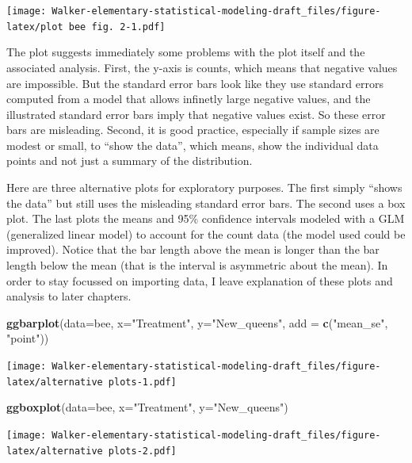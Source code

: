 \documentclass[]{book}
\newenvironment{Shaded}{\begin{snugshade}}{\end{snugshade}}
\newcommand{\KeywordTok}[1]{\textcolor[rgb]{0.13,0.29,0.53}{\textbf{#1}}}
\newcommand{\DataTypeTok}[1]{\textcolor[rgb]{0.13,0.29,0.53}{#1}}
\newcommand{\StringTok}[1]{\textcolor[rgb]{0.31,0.60,0.02}{#1}}
\newcommand{\NormalTok}[1]{#1}
\theoremstyle{definition}
\theoremstyle{definition}
\theoremstyle{definition}
\theoremstyle{remark}
\begin{document}
\texttt{[image: Walker-elementary-statistical-modeling-draft\_files/figure-latex/plot bee fig. 2-1.pdf]}

The plot suggests immediately some problems with the plot itself and the
associated analysis. First, the y-axis is counts, which means that
negative values are impossible. But the standard error bars look like
they use standard errors computed from a model that allows infinetly
large negative values, and the illustrated standard error bars imply
that negative values exist. So these error bars are misleading. Second,
it is good practice, especially if sample sizes are modest or small, to
``show the data'', which means, show the individual data points and not
just a summary of the distribution.

Here are three alternative plots for exploratory purposes. The first
simply ``shows the data'' but still uses the misleading standard error
bars. The second uses a box plot. The last plots the means and 95\%
confidence intervals modeled with a GLM (generalized linear model) to
account for the count data (the model used could be improved). Notice
that the bar length above the mean is longer than the bar length below
the mean (that is the interval is asymmetric about the mean). In order
to stay focussed on importing data, I leave explanation of these plots
and analysis to later chapters.

\begin{Shaded}
\begin{Highlighting}[]
\KeywordTok{ggbarplot}\NormalTok{(}\DataTypeTok{data=}\NormalTok{bee, }\DataTypeTok{x=}\StringTok{"Treatment"}\NormalTok{, }\DataTypeTok{y=}\StringTok{"New_queens"}\NormalTok{, }\DataTypeTok{add =} \KeywordTok{c}\NormalTok{(}\StringTok{"mean_se"}\NormalTok{, }\StringTok{"point"}\NormalTok{))}
\end{Highlighting}
\end{Shaded}

\texttt{[image: Walker-elementary-statistical-modeling-draft\_files/figure-latex/alternative plots-1.pdf]}

\begin{Shaded}
\begin{Highlighting}[]
\KeywordTok{ggboxplot}\NormalTok{(}\DataTypeTok{data=}\NormalTok{bee, }\DataTypeTok{x=}\StringTok{"Treatment"}\NormalTok{, }\DataTypeTok{y=}\StringTok{"New_queens"}\NormalTok{)}
\end{Highlighting}
\end{Shaded}

\texttt{[image: Walker-elementary-statistical-modeling-draft\_files/figure-latex/alternative plots-2.pdf]}
\end{document}
